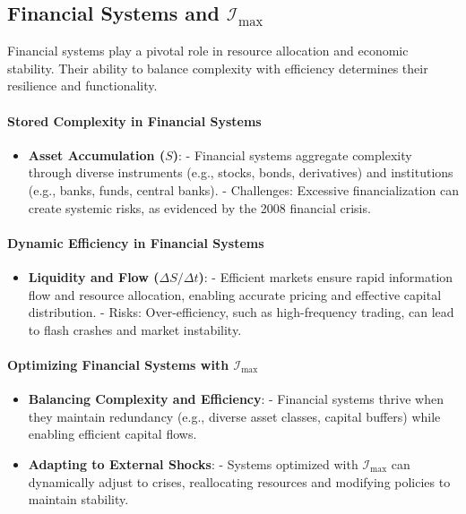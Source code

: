 \documentclass[12pt]{article}
\begin{document}
\subsection{Financial Systems and \(\mathcal{I}_{\text{max}}\)}
Financial systems play a pivotal role in resource allocation and economic stability. Their ability to balance complexity with efficiency determines their resilience and functionality.

\paragraph{Stored Complexity in Financial Systems}
\begin{itemize}
    \item \textbf{Asset Accumulation (\( S \))}:
        - Financial systems aggregate complexity through diverse instruments (e.g., stocks, bonds, derivatives) and institutions (e.g., banks, funds, central banks).
        - Challenges: Excessive financialization can create systemic risks, as evidenced by the 2008 financial crisis.
\end{itemize}

\paragraph{Dynamic Efficiency in Financial Systems}
\begin{itemize}
    \item \textbf{Liquidity and Flow (\( \Delta S / \Delta t \))}:
        - Efficient markets ensure rapid information flow and resource allocation, enabling accurate pricing and effective capital distribution.
        - Risks: Over-efficiency, such as high-frequency trading, can lead to flash crashes and market instability.
\end{itemize}

\paragraph{Optimizing Financial Systems with \(\mathcal{I}_{\text{max}}\)}
\begin{itemize}
    \item \textbf{Balancing Complexity and Efficiency}:
        - Financial systems thrive when they maintain redundancy (e.g., diverse asset classes, capital buffers) while enabling efficient capital flows.
    \item \textbf{Adapting to External Shocks}:
        - Systems optimized with \(\mathcal{I}_{\text{max}}\) can dynamically adjust to crises, reallocating resources and modifying policies to maintain stability.
\end{itemize}
\end{document}
